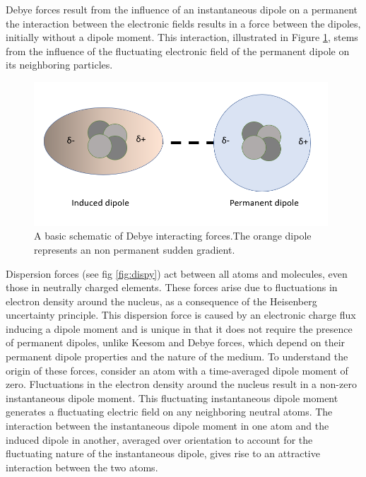 Debye forces result from the influence of an instantaneous dipole on a permanent 
the interaction between the electronic fields results in a force between the dipoles, initially without a dipole moment. This interaction, illustrated in Figure \ref{fig:debye}, stems from the influence of the fluctuating electronic field of the permanent dipole on its neighboring particles.

\begin{figure}[h!]     %
        \begin{center}
          \includegraphics[width=110mm]{chapter1/debye.PNG}
\end{center}
\caption{A basic schematic of Debye interacting forces.The orange dipole represents an non permanent sudden gradient.}
\label{fig:debye}                 %
\end{figure}

Dispersion forces (see fig \ref{fig:dispy}) act between all atoms and molecules, even those in neutrally charged elements. These forces arise due to fluctuations in electron density around the nucleus, as a consequence of the Heisenberg uncertainty principle.\cite{heisenberg1927uber} \cite{griffiths2005} This dispersion force is caused by an electronic charge flux inducing a dipole moment and is unique in that it does not require the presence of permanent dipoles, unlike Keesom and Debye forces, which depend on their permanent dipole properties and the nature of the medium. \cite{IsGreenBook} To understand the origin of these forces, consider an atom with a time-averaged dipole moment of zero. Fluctuations in the electron density around the nucleus result in a non-zero instantaneous dipole moment. This fluctuating instantaneous dipole moment generates a fluctuating electric field on any neighboring neutral atoms. The interaction between the instantaneous dipole moment in one atom and the induced dipole in another, averaged over orientation to account for the fluctuating nature of the instantaneous dipole, gives rise to an attractive interaction between the two atoms. 

